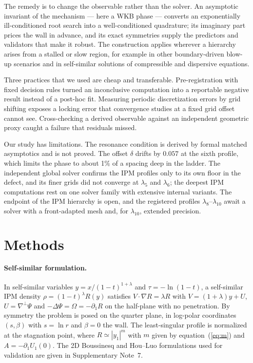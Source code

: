 \documentclass[11pt]{article}
\begin{document}
The remedy is to change the observable rather than the solver. An asymptotic invariant of the mechanism --- here a
WKB phase --- converts an exponentially ill-conditioned root search into a well-conditioned quadrature; its imaginary
part prices the wall in advance, and its exact symmetries supply the predictors and validators that make it robust.
The construction applies wherever a hierarchy arises from a stalled or slow region, for example in other
boundary-driven blow-up scenarios\cite{chen2021cmp,kiselev2014} and in self-similar solutions of compressible and
dispersive equations\cite{merle2022,eggers2015}.

Three practices that we used are cheap and transferable\cite{peng2011,stodden2016}. Pre-registration with fixed
decision rules\cite{nosek2018} turned an inconclusive computation into a reportable negative result instead of a
post-hoc fit. Measuring periodic discretization errors by grid shifting exposes a locking error that convergence
studies at a fixed grid offset cannot see. Cross-checking a derived observable against an independent geometric proxy
caught a failure that residuals missed.

Our study has limitations. The resonance condition is derived by formal matched asymptotics and is not proved. The
offset $\delta$ drifts by $0.057$ at the sixth profile, which limits the phase to about 1\% of a spacing deep in the
ladder. The independent global solver confirms the IPM profiles only to its own floor in the defect, and its finer
grids did not converge at $\lambda_5$ and $\lambda_6$; the deepest IPM computations rest on one solver family with
extensive internal variants. The endpoint of the IPM hierarchy is open, and the registered profiles $\lambda_8$--$\lambda_{10}$
await a solver with a front-adapted mesh and, for $\lambda_{10}$, extended precision.

\section*{Methods}

\paragraph{Self-similar formulation.} In self-similar variables $y=x/(1-t)^{1+\lambda}$ and $\tau=-\ln(1-t)$, a
self-similar IPM density $\rho=(1-t)^{\lambda}R(y)$ satisfies $V\cdot\nabla R=\lambda R$ with $V=(1+\lambda)y+U$,
$U=\nabla^{\perp}\Psi$ and $-\Delta\Psi=\Omega=-\partial_1R$ on the half-plane with no penetration. By symmetry the
problem is posed on the quarter plane, in log-polar coordinates $(s,\beta)$ with $s=\ln r$ and $\beta=0$ the wall.
The least-singular profile is normalized at the stagnation point, where $R\simeq|y_1|^m$ with $m$ given by
equation~(\ref{eq:m}) and $A=-\partial_1U_1(0)$. The 2D Boussinesq and Hou--Luo formulations used for validation are
given in Supplementary Note~7.
\end{document}
